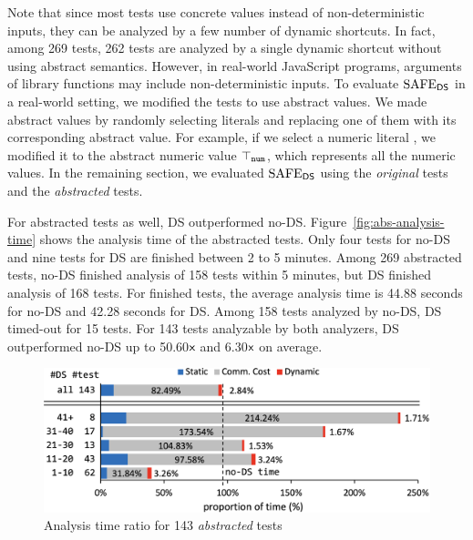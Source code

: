 Note that since most tests use concrete values instead of
non-deterministic inputs, they can be analyzed by a few number of dynamic shortcuts.
In fact, among 269 tests, 262 tests are analyzed
by a single dynamic shortcut without using abstract semantics.
However, in real-world JavaScript programs, arguments of library
functions may include non-deterministic inputs.
To evaluate $\text{SAFE}_{\textsf{DS}}$ in a real-world setting,
we modified the tests to use abstract values.
We made abstract values by randomly selecting literals and replacing
one of them with its corresponding abstract value.
For example, if we select a numeric literal , we modified it to the abstract numeric value
$\top_{\texttt{num}}$, which represents all the numeric values.
In the remaining section, we evaluated $\text{SAFE}_{\textsf{DS}}$ using the \textit{original} tests
and the \textit{abstracted} tests.

For abstracted tests as well, DS outperformed no-DS.
Figure~\ref{fig:abs-analysis-time} shows the analysis time of the abstracted tests.
Only four tests for no-DS and nine tests for DS are finished between 2 to 5 minutes.
Among 269 abstracted tests, no-DS finished analysis of 158 tests within 5 minutes,
but DS finished analysis of 168 tests.  For finished tests, the average analysis
time is 44.88 seconds for no-DS and 42.28 seconds for DS. Among 158 tests analyzed by no-DS, DS
timed-out for 15 tests.  For 143 tests analyzable by both analyzers,
DS outperformed no-DS up to 50.60${\textsf{x}}$ and 6.30${\textsf{x}}$ on average.

\begin{figure}[t]
  \centering
  \includegraphics[width=\linewidth]{img/abs-analysis-ratio}
  \vspace*{-1.5em}
  \caption{Analysis time ratio for 143 \textit{abstracted} tests}
  \label{fig:abs-analysis-ratio}
  \vspace*{-1.5em}
\end{figure}

